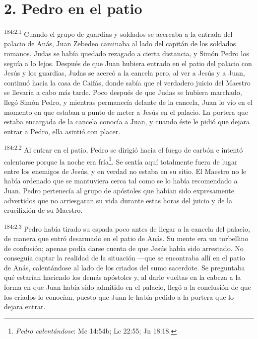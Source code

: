 \section*{2. Pedro en el patio}
\par 
\textsuperscript{184:2.1} Cuando el grupo de guardias y soldados se acercaba a la entrada del palacio de Anás, Juan Zebedeo caminaba al lado del capitán de los soldados romanos. Judas se había quedado rezagado a cierta distancia, y Simón Pedro los seguía a lo lejos. Después de que Juan hubiera entrado en el patio del palacio con Jesús y los guardias, Judas se acercó a la cancela pero, al ver a Jesús y a Juan, continuó hacia la casa de Caifás, donde sabía que el verdadero juicio del Maestro se llevaría a cabo más tarde. Poco después de que Judas se hubiera marchado, llegó Simón Pedro, y mientras permanecía delante de la cancela, Juan lo vio en el momento en que estaban a punto de meter a Jesús en el palacio. La portera que estaba encargada de la cancela conocía a Juan, y cuando éste le pidió que dejara entrar a Pedro, ella asintió con placer.

\par 
\textsuperscript{184:2.2} Al entrar en el patio, Pedro se dirigió hacia el fuego de carbón e intentó calentarse porque la noche era fría\footnote{\textit{Pedro calentándose}: Mc 14:54b; Lc 22:55; Jn 18:18.}. Se sentía aquí totalmente fuera de lugar entre los enemigos de Jesús, y en verdad no estaba en su sitio. El Maestro no le había ordenado que se mantuviera cerca tal como se lo había recomendado a Juan. Pedro pertenecía al grupo de apóstoles que habían sido expresamente advertidos que no arriesgaran su vida durante estas horas del juicio y de la crucifixión de su Maestro.

\par 
\textsuperscript{184:2.3} Pedro había tirado su espada poco antes de llegar a la cancela del palacio, de manera que entró desarmado en el patio de Anás. Su mente era un torbellino de confusión; apenas podía darse cuenta de que Jesús había sido arrestado. No conseguía captar la realidad de la situación ---que se encontraba allí en el patio de Anás, calentándose al lado de los criados del sumo sacerdote. Se preguntaba qué estarían haciendo los demás apóstoles y, al darle vueltas en la cabeza a la forma en que Juan había sido admitido en el palacio, llegó a la conclusión de que los criados lo conocían, puesto que Juan le había pedido a la portera que lo dejara entrar.

